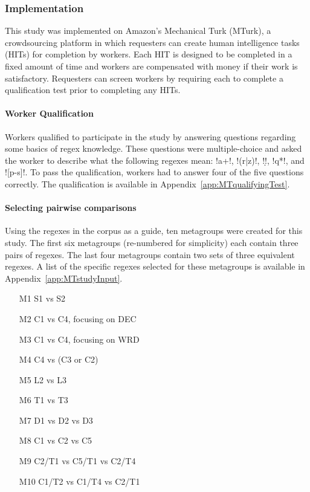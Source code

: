 \subsubsection{Implementation}
This study was implemented on Amazon's Mechanical Turk (MTurk),  a crowdsourcing platform in which requesters can create human intelligence tasks (HITs) for completion by workers. Each HIT is designed to be completed in a fixed amount of time and workers are compensated with money if their work is satisfactory. Requesters can screen workers by requiring each to complete a qualification test prior to completing any HITs.

\paragraph{Worker Qualification}
Workers qualified to participate in the study by answering questions regarding some basics of regex knowledge. These questions were multiple-choice and asked the worker to describe what the following regexes mean: \cverb!a+!, \cverb!(r|z)!, \cverb!\d!, \cverb!q*!, and \cverb![p-s]!. To pass the qualification, workers had to answer four of the five questions correctly.  The qualification is available in Appendix~\ref{app:MTqualifyingTest}.

\paragraph{Selecting pairwise comparisons}

 Using the regexes in the corpus as a guide, ten metagroups were created for this study.  The first six metagroups (re-numbered for simplicity) each contain three pairs of regexes.  The last four metagroups contain two sets of three equivalent regexes.  A list of the specific regexes selected for these metagroups is available in Appendix~\ref{app:MTstudyInput}.

\begin{multicols}{2}
\begin{itemize}[noitemsep,topsep=0pt]
\item[M1]  S1 vs S2
\item[M2]  C1 vs C4, focusing on DEC
\item[M3]  C1 vs C4, focusing on WRD
\item[M4]  C4 vs (C3 or C2)
\item[M5]  L2 vs L3
\item[M6]  T1 vs T3
\item[M7]  D1 vs D2 vs D3
\item[M8]  C1 vs C2 vs C5
\item[M9]  C2/T1 vs C5/T1 vs C2/T4
\item[M10] C1/T2 vs C1/T4 vs C2/T1
\end{itemize}
\end{multicols}

